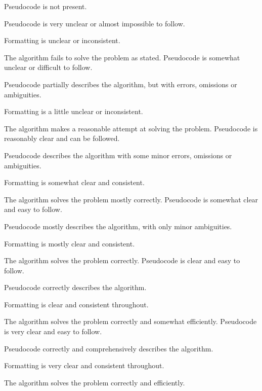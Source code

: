 \documentclass{../../../fal_assignment}
\begin{document}
\begin{markingrubric}
        \grade\fail Pseudocode is not present.
			\par Pseudocode is very unclear or almost impossible to follow.
			\par Formatting is unclear or inconsistent.
			\par The algorithm fails to solve the problem as stated.
        \grade Pseudocode is somewhat unclear or difficult to follow.
			\par Pseudocode partially describes the algorithm, but with errors, omissions or ambiguities.
			\par Formatting is a little unclear or inconsistent.
			\par The algorithm makes a reasonable attempt at solving the problem.
        \grade Pseudocode is reasonably clear and can be followed.
			\par Pseudocode describes the algorithm with some minor errors, omissions or ambiguities.
			\par Formatting is somewhat clear and consistent.
			\par The algorithm solves the problem mostly correctly.
        \grade Pseudocode is somewhat clear and easy to follow.
			\par Pseudocode mostly describes the algorithm, with only minor ambiguities.
			\par Formatting is mostly clear and consistent.
			\par The algorithm solves the problem correctly.
        \grade Pseudocode is clear and easy to follow.
			\par Pseudocode correctly describes the algorithm.
			\par Formatting is clear and consistent throughout.
			\par The algorithm solves the problem correctly and somewhat efficiently.
        \grade Pseudocode is very clear and easy to follow.
			\par Pseudocode correctly and comprehensively describes the algorithm.
			\par Formatting is very clear and consistent throughout.
			\par The algorithm solves the problem correctly and efficiently.
\end{markingrubric}
\end{document}
